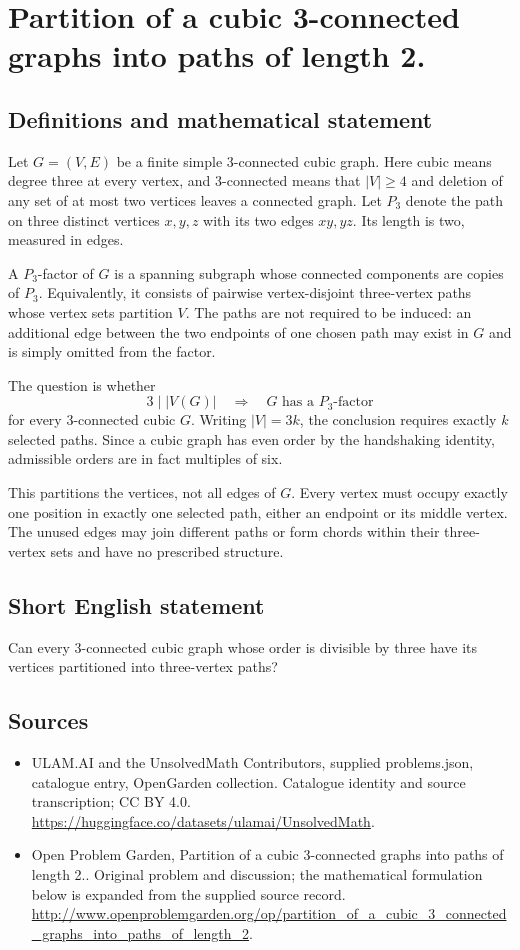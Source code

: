 \documentclass[11pt,a4paper]{article}
\begin{document}
\section*{Partition of a cubic 3-connected graphs into paths of length 2.}\label{statement}

\subsection{Definitions and mathematical statement}
Let $G=(V,E)$ be a finite simple $3$-connected cubic
graph. Here cubic means degree three at every vertex,
and $3$-connected means that $|V|\geq4$ and deletion
of any set of at most two vertices leaves a
connected graph. Let $P_3$ denote the path on three
distinct vertices $x,y,z$ with its two edges $xy,yz$.
Its length is two, measured in edges.

A $P_3$-factor of $G$ is a spanning subgraph whose
connected components are copies of $P_3$. Equivalently,
it consists of pairwise vertex-disjoint three-vertex
paths whose vertex sets partition $V$. The paths
are not required to be induced: an additional edge
between the two endpoints of one chosen path may
exist in $G$ and is simply omitted from the factor.

The question is whether
\[
 3\mid |V(G)|\quad\Longrightarrow\quad
 G\text{ has a }P_3\text{-factor}
\]
for every $3$-connected cubic $G$. Writing $|V|=3k$,
the conclusion requires exactly $k$ selected paths.
Since a cubic graph has even order by the
handshaking identity, admissible orders are in fact
multiples of six.

This partitions the vertices, not all edges of
$G$. Every vertex must occupy exactly one position
in exactly one selected path, either an endpoint
or its middle vertex. The unused edges may join
different paths or form chords within their
three-vertex sets and have no prescribed structure.
\subsection{Short English statement}
Can every 3-connected cubic graph whose order is divisible by three have its vertices partitioned into three-vertex paths?
\subsection{Sources}
\begin{itemize}
\item[S1] ULAM.AI and the UnsolvedMath Contributors, supplied problems.json, catalogue entry, OpenGarden collection. Catalogue identity and source transcription; CC BY 4.0.
\url{https://huggingface.co/datasets/ulamai/UnsolvedMath}.
\item[S2] Open Problem Garden, Partition of a cubic 3-connected graphs into paths of length 2.. Original problem and discussion; the mathematical formulation below is expanded from the supplied source record.
\url{http://www.openproblemgarden.org/op/partition_of_a_cubic_3_connected_graphs_into_paths_of_length_2}.
\end{itemize}
\end{document}
